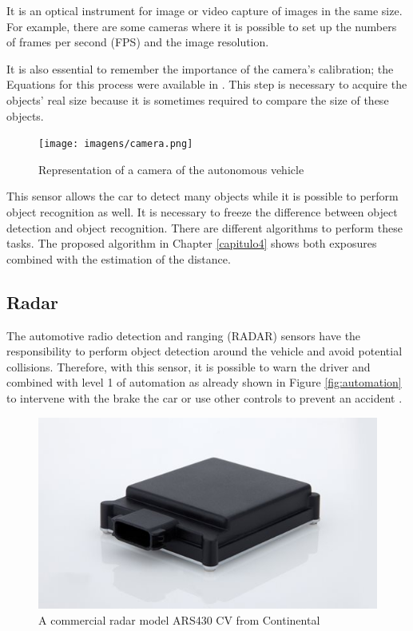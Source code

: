 It is an optical instrument for image or video capture of images in the same size. For example, there are some cameras where it is possible to set up the numbers of frames per second (FPS) and the image resolution. 

It is also essential to remember the importance of the camera's calibration; the Equations for this process were available in \cite{888718}. This step is necessary to acquire the objects' real size because it is sometimes required to compare the size of these objects. 

\begin{figure}[H]
\centering
\texttt{[image: imagens/camera.png]}
\caption{Representation of a camera of the autonomous vehicle}
\label{fig:camera}
\end{figure}

This sensor allows the car to detect many objects while it is possible to perform object recognition as well. It is necessary to freeze the difference between object detection and object recognition. There are different algorithms to perform these tasks. The proposed algorithm in Chapter \ref{capitulo4} shows both exposures combined with the estimation of the distance. 

\subsection{Radar}

The automotive radio detection and ranging (RADAR) sensors have the responsibility to perform object detection around the vehicle and avoid potential collisions. Therefore, with this sensor, it is possible to warn the driver and combined with level 1 of automation as already shown in Figure \ref{fig:automation} to intervene with the brake the car or use other controls to prevent an accident \cite{ariyur2006collision}.

\begin{figure}[H]
\centering
\includegraphics[width=\columnwidth]{imagens/radar.jpg}
\caption{A commercial radar model ARS430 CV from Continental}
\label{fig:camera}
\end{figure}


